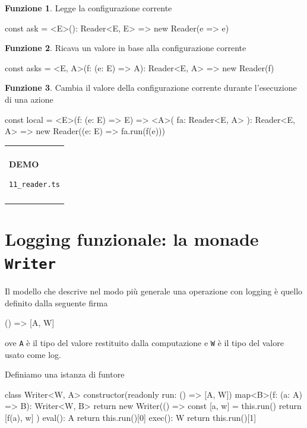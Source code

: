 \documentclass[12pt]{article}
\theoremstyle{definition}
\newtheorem{function}{Funzione}[section]
\newenvironment{demo}
    {\begin{center}
    \begin{tabular}{|p{0.9\textwidth}|}
    \hline\\
    }
    {
    \\\\\hline
    \end{tabular}
    \end{center}
    }
\newenvironment{code}
  {\vspace{0.5cm} \VerbatimEnvironment\begin{typescriptcode}}
  {\end{typescriptcode} \vspace{0.2cm}}
\begin{document}
\begin{function}
Legge la configurazione corrente

\begin{code}
const ask = <E>(): Reader<E, E> => new Reader(e => e)
\end{code}
\end{function}

\begin{function}
Ricava un valore in base alla configurazione corrente

\begin{code}
const asks = <E, A>(f: (e: E) => A): Reader<E, A> =>
  new Reader(f)

\end{code}
\end{function}

\begin{function}
Cambia il valore della configurazione corrente durante l'esecuzione di una azione

\begin{code}
const local = <E>(f: (e: E) => E) => <A>(
  fa: Reader<E, A>
): Reader<E, A> => new Reader((e: E) => fa.run(f(e)))
\end{code}
\end{function}

\begin{demo}
\begin{center}
\textbf{DEMO}

\texttt{11\_reader.ts}
\end{center}
\end{demo}

\newpage

\section{Logging funzionale: la monade \texttt{Writer}}

Il modello che descrive nel modo più generale una operazione con logging è quello definito dalla seguente firma

\begin{code}
() => [A, W]
\end{code}

ove \texttt{A} è il tipo del valore restituito dalla computazione e \texttt{W} è il tipo del valore usato come log.

Definiamo una istanza di funtore

\begin{code}
class Writer<W, A> {
  constructor(readonly run: () => [A, W]) {}
  map<B>(f: (a: A) => B): Writer<W, B> {
    return new Writer(() => {
      const [a, w] = this.run()
      return [f(a), w]
    })
  }
  eval(): A {
    return this.run()[0]
  }
  exec(): W {
    return this.run()[1]
  }
}
\end{code}
\end{document}
